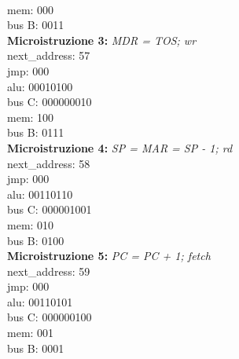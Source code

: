 \documentclass[12pt]{article}
\begin{document}
\\\hspace*{1cm} mem: 000
\\\hspace*{1cm} bus B: 0011
\\ \textbf{Microistruzione 3:}	\hspace*{1cm} \textit{MDR = TOS; wr}
\\\hspace*{1cm} next\_address: 57
\\\hspace*{1cm} jmp: 000
\\\hspace*{1cm} alu: 00010100
\\\hspace*{1cm} bus C: 000000010
\\\hspace*{1cm} mem: 100
\\\hspace*{1cm} bus B: 0111
\\ \textbf{Microistruzione 4:}	\hspace*{1cm} \textit{SP = MAR = SP - 1; rd}
\\\hspace*{1cm} next\_address: 58
\\\hspace*{1cm} jmp: 000
\\\hspace*{1cm} alu: 00110110
\\\hspace*{1cm} bus C: 000001001
\\\hspace*{1cm} mem: 010
\\\hspace*{1cm} bus B: 0100
\\ \textbf{Microistruzione 5:}	\hspace*{1cm} \textit{PC = PC + 1; fetch}
\\\hspace*{1cm} next\_address: 59
\\\hspace*{1cm} jmp: 000
\\\hspace*{1cm} alu: 00110101
\\\hspace*{1cm} bus C: 000000100
\\\hspace*{1cm} mem: 001
\\\hspace*{1cm} bus B: 0001
\end{document}
